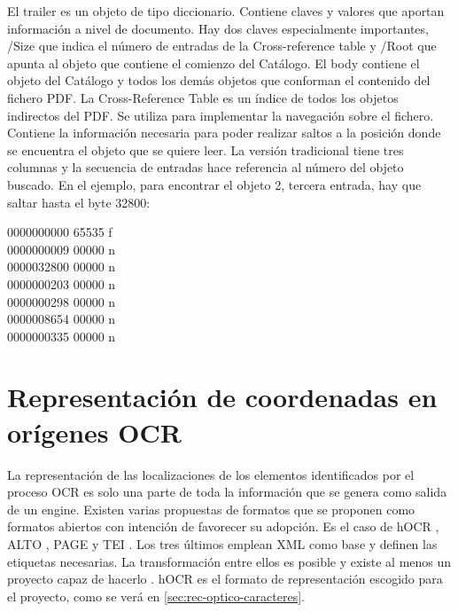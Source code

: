 El trailer es un objeto de tipo diccionario. Contiene claves y valores que aportan información a nivel de documento. Hay dos claves especialmente importantes, /Size que indica el número de entradas de la Cross-reference table y /Root que apunta al objeto que contiene el comienzo del Catálogo. El body contiene el objeto del Catálogo y todos los demás objetos que conforman el contenido del fichero PDF. La Cross-Reference Table es un índice de todos los objetos indirectos del PDF. Se utiliza para implementar la navegación sobre el fichero. Contiene la información necesaria para poder realizar saltos a la posición donde se encuentra el objeto que se quiere leer. La versión tradicional tiene tres columnas y la secuencia de entradas hace referencia al número del objeto buscado. En el ejemplo, para encontrar el objeto 2, tercera entrada, hay que saltar hasta el byte 32800:


0000000000 65535 f\\
0000000009 00000 n\\
0000032800 00000 n\\
0000000203 00000 n\\
0000000298 00000 n\\
0000008654 00000 n\\
0000000335 00000 n



\section{Representación de coordenadas en orígenes OCR}

La representación de las localizaciones de los elementos identificados por el proceso OCR es solo una parte de toda la información que se genera como salida de un engine. Existen varias propuestas de formatos que se proponen como formatos abiertos con intención de favorecer su adopción. Es el caso de hOCR \cite{ocrRepres_hocr_breuel_spec}, ALTO \cite{ocrRepres_alto_spec}, PAGE \cite{ocrRepres_page_pletschacher_paper} y TEI \cite{ocrRepres_tei_project}. Los tres últimos emplean XML como base y definen las etiquetas necesarias. La transformación entre ellos es posible y existe al menos un proyecto capaz de hacerlo
\cite{ocrRepres_conversion_ocrFileformat}. hOCR es el formato de representación escogido para el proyecto, como se verá en \ref{sec:rec-optico-caracteres}.

